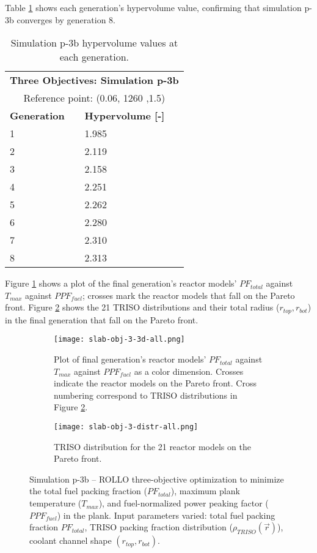 Table \ref{tab:p3b-hypervolume} shows each generation's hypervolume value, 
confirming that simulation p-3b converges by generation 8. 
\begin{table}[htbp!]
    \centering
    \onehalfspacing
    \caption{Simulation p-3b hypervolume values at each generation.}
	\label{tab:p3b-hypervolume}
    \footnotesize
    \begin{tabular}{ll}
    \hline 
    \multicolumn{2}{c}{\textbf{Three Objectives: Simulation p-3b}} \\
    \multicolumn{2}{c}{Reference point: (0.06, 1260 ,1.5)} \\
    \hline 
    \textbf{Generation} & \textbf{Hypervolume [-]} \\
    \hline
    1 & 1.985 \\
    2 & 2.119 \\
    3 & 2.158 \\
    4 & 2.251\\
    5 & 2.262 \\
    6 & 2.280 \\
    7 & 2.310 \\
    8 & 2.313 \\
    \hline
    \end{tabular}
\end{table}

Figure \ref{fig:slab-obj-3-3d-all} shows a plot of the final generation's reactor 
models' $PF_{total}$ against $T_{max}$ against $PPF_{fuel}$; 
crosses mark the reactor models that fall on the Pareto front.
Figure \ref{fig:slab-obj-3-distr-all} shows the 21 TRISO distributions and their
total radius ($r_{top}, r_{bot}$) in the final generation that fall on the Pareto 
front. 
\begin{figure}[htbp!]
    \begin{subfigure}{\textwidth}
        \centering
        \texttt{[image: slab-obj-3-3d-all.png]}
        \caption{Plot of final generation's reactor models' $PF_{total}$ against 
        $T_{max}$ against $PPF_{fuel}$ as a color dimension. 
        Crosses indicate the reactor models on the 
        Pareto front. Cross numbering correspond to TRISO distributions in Figure 
        \ref{fig:slab-obj-3-distr-all}.}
        \label{fig:slab-obj-3-3d-all} 
    \end{subfigure}
    \begin{subfigure}{\textwidth}
        \texttt{[image: slab-obj-3-distr-all.png]}
        \caption{TRISO distribution for the 21 reactor models on the Pareto front.}
        \label{fig:slab-obj-3-distr-all} 
    \end{subfigure}
    \caption{Simulation p-3b -- ROLLO three-objective optimization to minimize the total 
    fuel packing fraction ($PF_{total}$), maximum plank temperature ($T_{max}$), and 
    fuel-normalized power peaking factor ($PPF_{fuel}$) in the plank. 
    Input parameters varied: total fuel packing fraction $PF_{total}$, 
    TRISO packing fraction distribution ($\rho_{TRISO}(\vec{r})$), 
    coolant channel shape $(r_{top}, r_{bot})$.}
    \label{fig:slab-obj-3-all}
\end{figure}

